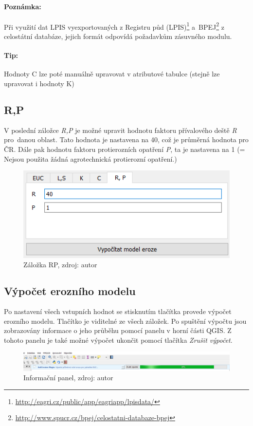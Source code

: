 \paragraph{Poznámka:} Při využití dat LPIS vyexportovaných z Registru
půd
(LPIS)\footnote{\url{http://eagri.cz/public/app/eagriapp/lpisdata/}}
a~BPEJ\footnote{\url{http://www.spucr.cz/bpej/celostatni-databaze-bpej}}
z celostátní databáze, jejich formát odpovídá požadavkům zásuvného
modulu.
\paragraph{Tip:} Hodnoty C lze poté manuálně upravovat v atributové
tabulce (stejně lze upravovat i hodnoty K)
\subsection{R,P} V poslední záložce \textit{R,P} je možné upravit
hodnotu faktoru přívalového deště \textit{R} pro~danou oblast. Tato
hodnota je nastavena na 40, což je průměrná hodnota pro ČR. Dále pak
hodnotu faktoru protierozních opatření \textit{P}, ta je nastavena na
1 (= Nejsou použita žádná agrotechnická protierozní opatření.)
\begin{figure}[H] \centering
		\includegraphics[width=.55\textwidth]{./pictures/rp.png}
		\caption[Záložka RP]{Záložka RP, zdroj: autor}
		\label{zalozka_rp}
\end{figure}
\subsection{Výpočet erozního modelu} Po nastavení všech vstupních
hodnot se stisknutím tlačítka provede výpočet erozního
modelu. Tlačítko je viditelné ze všech záložek. Po spuštění výpočtu
jsou zobrazovány informace o jeho průběhu pomocí panelu v horní části
QGIS. Z tohoto panelu je také možné výpočet ukončit pomocí tlačítka
\textit{Zrušit výpočet}.
\begin{figure}[H] \centering
		\includegraphics[width=.9\textwidth]{./pictures/progressbar.png}
		\caption[Informačního panel]{Informační panel,
zdroj: autor}
		\label{informacni_panel}
\end{figure}
